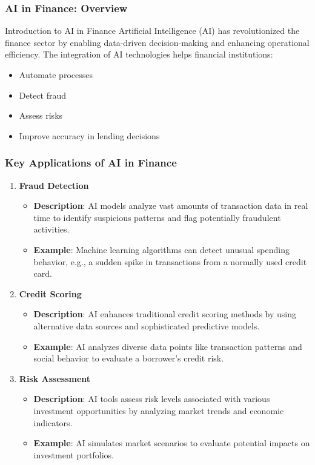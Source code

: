 \documentclass[aspectratio=169]{beamer}
\begin{document}
\begin{frame}[fragile]
    \frametitle{AI in Finance: Overview}
    \begin{block}{Introduction to AI in Finance}
        Artificial Intelligence (AI) has revolutionized the finance sector by enabling data-driven decision-making and enhancing operational efficiency. The integration of AI technologies helps financial institutions:
        \begin{itemize}
            \item Automate processes
            \item Detect fraud
            \item Assess risks
            \item Improve accuracy in lending decisions
        \end{itemize}
    \end{block}
\end{frame}

\begin{frame}[fragile]
    \frametitle{Key Applications of AI in Finance}
    \begin{enumerate}
        \item \textbf{Fraud Detection}
            \begin{itemize}
                \item \textbf{Description}: AI models analyze vast amounts of transaction data in real time to identify suspicious patterns and flag potentially fraudulent activities.
                \item \textbf{Example}: Machine learning algorithms can detect unusual spending behavior, e.g., a sudden spike in transactions from a normally used credit card.
            \end{itemize}
        
        \item \textbf{Credit Scoring}
            \begin{itemize}
                \item \textbf{Description}: AI enhances traditional credit scoring methods by using alternative data sources and sophisticated predictive models.
                \item \textbf{Example}: AI analyzes diverse data points like transaction patterns and social behavior to evaluate a borrower’s credit risk.
            \end{itemize}

        \item \textbf{Risk Assessment}
            \begin{itemize}
                \item \textbf{Description}: AI tools assess risk levels associated with various investment opportunities by analyzing market trends and economic indicators.
                \item \textbf{Example}: AI simulates market scenarios to evaluate potential impacts on investment portfolios.
            \end{itemize}
    \end{enumerate}
\end{frame}
\end{document}
